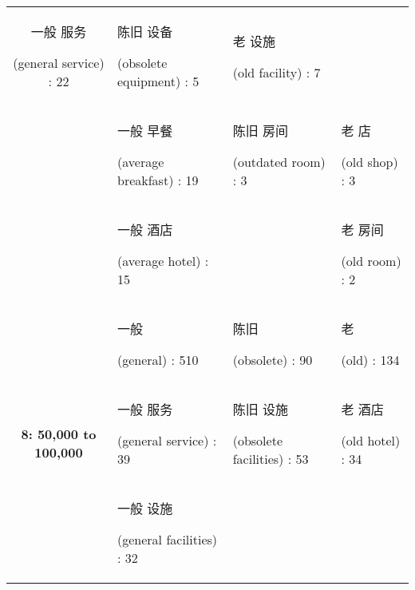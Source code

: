 \documentclass[smallextended,natbib]{svjour3}       %
\begin{document}
\begin{landscape}
\begin{table}[p]
{\begin{tabular}{|c|l|l|l|}
          \begin{CJK}{UTF8}{gbsn}一般 服务\end{CJK} (general service) : 22 &
          \begin{CJK}{UTF8}{gbsn}陈旧 设备\end{CJK} (obsolete equipment) : 5 &
          \begin{CJK}{UTF8}{gbsn}老 设施\end{CJK} (old facility) : 7 \\
         &
          \begin{CJK}{UTF8}{gbsn}一般 早餐\end{CJK} (average breakfast) : 19 &
          \begin{CJK}{UTF8}{gbsn}陈旧 房间\end{CJK} (outdated room) : 3 &
          \begin{CJK}{UTF8}{gbsn}老 店\end{CJK} (old shop) : 3 \\
         &
          \begin{CJK}{UTF8}{gbsn}一般 酒店\end{CJK} (average hotel) : 15 &
           &
          \begin{CJK}{UTF8}{gbsn}老 房间\end{CJK} (old room) : 2 \\ \hline
        \multirow{5}{*}{\textbf{8: 50,000 to 100,000}} &
          \begin{CJK}{UTF8}{gbsn}一般\end{CJK} (general) : 510 &
          \begin{CJK}{UTF8}{gbsn}陈旧\end{CJK} (obsolete) : 90 &
          \begin{CJK}{UTF8}{gbsn}老\end{CJK} (old) : 134 \\
         &
          \begin{CJK}{UTF8}{gbsn}一般 服务\end{CJK} (general service) : 39 &
          \begin{CJK}{UTF8}{gbsn}陈旧 设施\end{CJK} (obsolete facilities) : 53 &
          \begin{CJK}{UTF8}{gbsn}老 酒店\end{CJK} (old hotel) : 34 \\
         &
          \begin{CJK}{UTF8}{gbsn}一般 设施\end{CJK} (general facilities) : 32 &

\end{tabular}}
\end{table}
\end{landscape}
\end{document}
